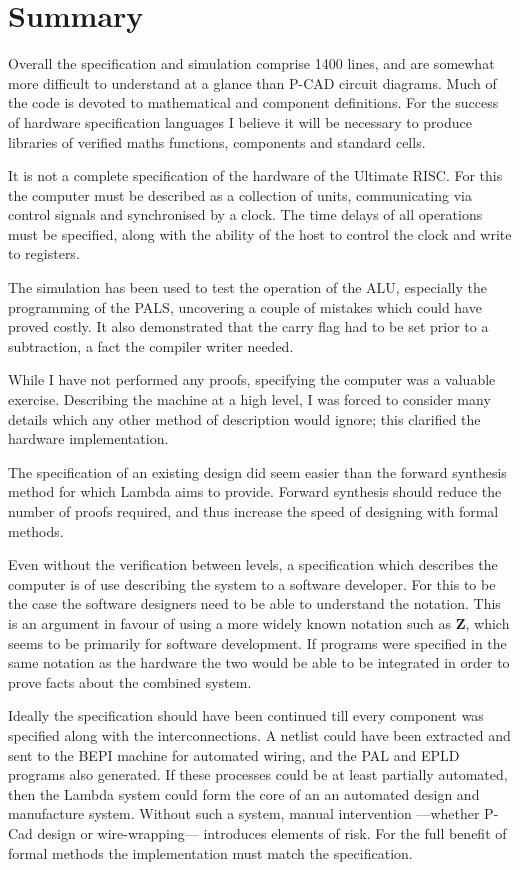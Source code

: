 \section{Summary}

Overall the specification and simulation comprise 
 1400 lines, and are somewhat more difficult to understand at a 
glance than P-CAD circuit diagrams. Much of the code is devoted to 
mathematical and component definitions. For the success of hardware 
specification languages I believe it will be necessary to produce 
libraries of verified maths functions, components  and standard cells.

 It is not a complete specification of the hardware of the 
 Ultimate RISC.
 For this the computer must be described as a collection 
of units, communicating via control signals and synchronised by a 
clock. 
The time delays of all operations must be specified, along 
with the ability of the host to control the clock and write to 
registers. 

The simulation has been used to test the operation of the ALU, 
especially the programming of the PALS,  uncovering a couple 
of mistakes which could have proved  costly.
It also demonstrated that the carry flag had to be set prior to a subtraction,  a fact the compiler writer needed. 

While I have not performed any proofs, specifying the computer was a valuable exercise. 
 Describing the machine at a high level, I was forced to consider many details which any other method of description would ignore;
 this clarified the hardware implementation. 

The specification of an existing design did seem easier than the forward synthesis method for which Lambda aims to provide. 
Forward synthesis should reduce the number of proofs required, and thus increase the speed of designing with formal methods.

Even without the verification between levels, a specification which describes the computer is of use  describing the system to a software developer. 
For this to be the case the software designers  need to be able to understand the notation. 
This is an argument in favour of using a more widely known notation such as {\bf Z}, which seems to be primarily for software development. 
If programs were specified in the same notation as the hardware  the two would be able to be integrated in order to prove facts about the combined system.

Ideally the specification should have been continued till every component was specified along with the interconnections.
A netlist could have been extracted and sent to the BEPI machine for automated wiring, and the PAL and EPLD programs also generated.
If these processes could be at least partially automated, then the Lambda system could form the core of an an automated design and manufacture system.
Without such a system,   manual intervention ---whether P-Cad design or wire-wrapping--- introduces elements of risk. For the full benefit of formal methods the implementation must match the specification.






